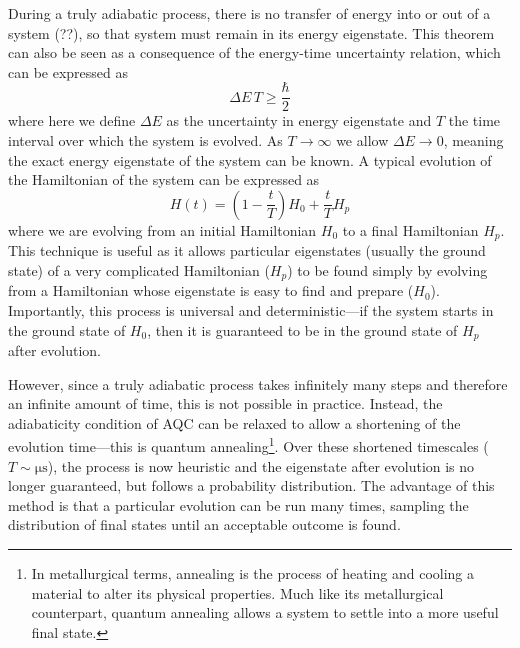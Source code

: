 \documentclass[12pt]{article}
\theoremstyle{definition}
\begin{document}
During a truly adiabatic process, there is no transfer of energy into or out of a system (??), so that system must remain in its energy eigenstate. This theorem can also be seen as a consequence of the energy-time uncertainty relation, which can be expressed as
\begin{equation}
    \Delta E\,T \ge \frac{\hbar}{2}
    \label{eq:energy-time}
\end{equation}
where here we define $\Delta E$ as the uncertainty in energy eigenstate and $T$ the time interval over which the system is evolved. As $T\to\infty$ we allow $\Delta E\to0$, meaning the exact energy eigenstate of the system can be known. A typical evolution of the Hamiltonian of the system can be expressed as
\begin{equation}
    H(t)=\left(1- \frac{t}{T}\right)H_0 + \frac{t}{T}H_p
    \label{eq:time-evolution}
\end{equation}
where we are evolving from an initial Hamiltonian $H_0$ to a final Hamiltonian $H_p$.
This technique is useful as it allows particular eigenstates (usually the ground state) of a very complicated Hamiltonian ($H_p$) to be found simply by evolving from a Hamiltonian whose eigenstate is easy to find and prepare ($H_0$). Importantly, this process is universal and deterministic---if the system starts in the ground state of $H_0$, then it is guaranteed to be in the ground state of $H_p$ after evolution.

However, since a truly adiabatic process takes infinitely many steps and therefore an infinite amount of time, this is not possible in practice. Instead, the adiabaticity condition of AQC can be relaxed to allow a shortening of the evolution time---this is quantum annealing\footnote{In metallurgical terms, annealing is the process of heating and cooling a material to alter its physical properties. Much like its metallurgical counterpart, quantum annealing allows a system to settle into a more useful final state.}. Over these shortened timescales ($T\sim\unit{\us}$), the process is now heuristic and the eigenstate after evolution is no longer guaranteed, but follows a probability distribution. The advantage of this method is that a particular evolution can be run many times, sampling the distribution of final states until an acceptable outcome is found.
\end{document}

